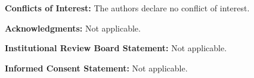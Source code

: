 \documentclass{mdpi}
\begin{document}
\vspace{4pt}
\noindent\textbf{Conflicts of Interest:} The authors declare no conflict of interest.

\vspace{4pt}
\noindent\textbf{Acknowledgments:} Not applicable.

\vspace{4pt}
\noindent\textbf{Institutional Review Board Statement:} Not applicable.

\vspace{4pt}
\noindent\textbf{Informed Consent Statement:} Not applicable.



\end{document}
